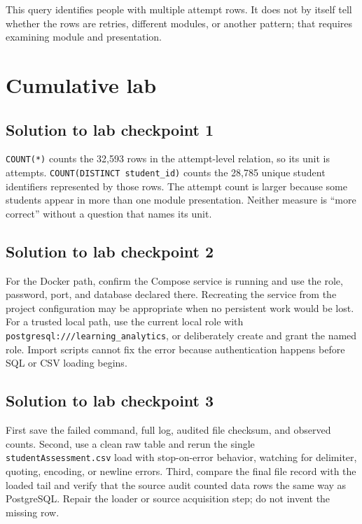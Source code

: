 This query identifies people with multiple attempt rows. It does not by itself
tell whether the rows are retries, different modules, or another pattern; that
requires examining module and presentation.

\section{Cumulative lab}

\subsection{Solution to lab checkpoint 1}
\label{sol:lab-grain}

\texttt{COUNT(*)} counts the 32,593 rows in the attempt-level relation, so its
unit is attempts. \texttt{COUNT(DISTINCT student\_id)} counts the 28,785 unique
student identifiers represented by those rows. The attempt count is larger
because some students appear in more than one module presentation. Neither
measure is ``more correct'' without a question that names its unit.

\subsection{Solution to lab checkpoint 2}
\label{sol:lab-environment}

For the Docker path, confirm the Compose service is running and use the role,
password, port, and database declared there. Recreating the service from the
project configuration may be appropriate when no persistent work would be
lost. For a trusted local path, use the current local role with
\texttt{postgresql:///learning\_analytics}, or deliberately create and grant
the named role. Import scripts cannot fix the error because authentication
happens before SQL or CSV loading begins.

\subsection{Solution to lab checkpoint 3}
\label{sol:lab-reconcile}

First save the failed command, full log, audited file checksum, and observed
counts. Second, use a clean raw table and rerun the single
\texttt{studentAssessment.csv} load with stop-on-error behavior, watching for
delimiter, quoting, encoding, or newline errors. Third, compare the final file
record with the loaded tail and verify that the source audit counted data rows
the same way as PostgreSQL. Repair the loader or source acquisition step; do
not invent the missing row.

